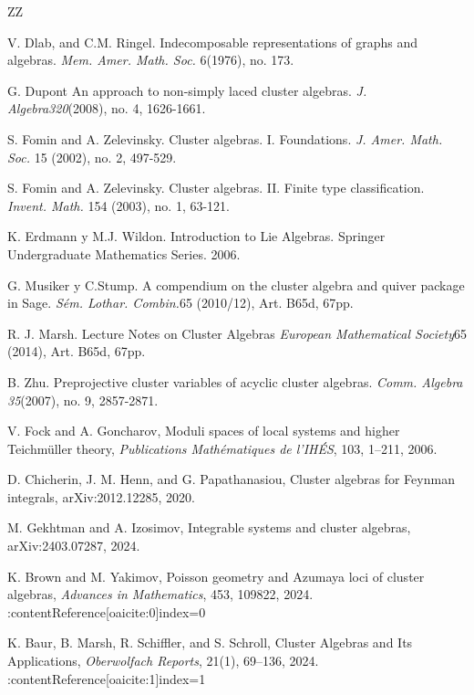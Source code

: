 \documentclass[12pt,a4paper]{article}
\begin{document}
\begin{thebibliography}{ZZ}

V. Dlab, and C.M. Ringel. Indecomposable representations of graphs and algebras. {\itshape Mem. Amer. Math. Soc.} 6(1976), no. 173.

G. Dupont An approach to non-simply laced cluster algebras. {\itshape J. Algebra320}(2008), no. 4, 1626-1661.

S. Fomin and A. Zelevinsky. Cluster algebras. I. Foundations. {\itshape J. Amer. Math. Soc.} 15 (2002), no. 2, 497-529.

S. Fomin and A. Zelevinsky. Cluster algebras. II. Finite type classification. {\itshape Invent. Math.} 154 (2003), no. 1, 63-121.

K. Erdmann y M.J. Wildon. Introduction to Lie Algebras. Springer Undergraduate Mathematics Series. 2006.

G. Musiker y C.Stump. A compendium on the cluster algebra and quiver package in Sage. {\itshape Sém. Lothar. Combin.}65 (2010/12), Art. B65d, 67pp.


R. J. Marsh.  Lecture Notes on Cluster Algebras {\itshape  European Mathematical Society}65 (2014), Art. B65d, 67pp.


B. Zhu. Preprojective cluster variables of acyclic cluster algebras. {\itshape Comm. Algebra 35}(2007), no. 9, 2857-2871. 







V. Fock and A. Goncharov,
\newblock Moduli spaces of local systems and higher Teichm\"uller theory,
\newblock \emph{Publications Math\'ematiques de l'IH\'ES}, 103, 1--211, 2006.

D. Chicherin, J. M. Henn, and G. Papathanasiou,
\newblock Cluster algebras for Feynman integrals,
\newblock arXiv:2012.12285, 2020. 

M. Gekhtman and A. Izosimov,
\newblock Integrable systems and cluster algebras,
\newblock arXiv:2403.07287, 2024.

K. Brown and M. Yakimov,
\newblock Poisson geometry and Azumaya loci of cluster algebras,
\newblock \emph{Advances in Mathematics}, 453, 109822, 2024. :contentReference[oaicite:0]{index=0}

K. Baur, B. Marsh, R. Schiffler, and S. Schroll,
\newblock Cluster Algebras and Its Applications,
\newblock \emph{Oberwolfach Reports}, 21(1), 69--136, 2024. :contentReference[oaicite:1]{index=1}

\end{thebibliography}
\end{document}
